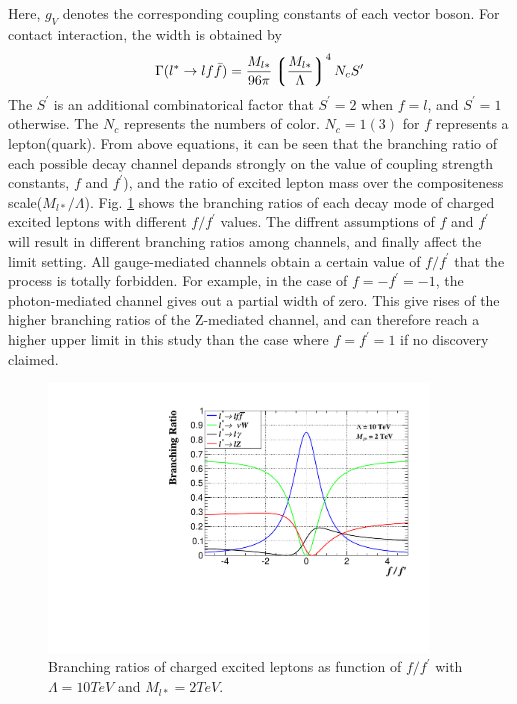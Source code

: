 \noindent Here, $g_{V}$ denotes the corresponding coupling constants of each vector boson. For contact interaction, the width is obtained by
\begin{align}
\Gamma (l^{*}\rightarrow lf\bar{f}) = \frac{M_{l*}}{96\pi}\left\lgroup \frac{M_{l*}}{\Lambda}\right\rgroup^{4}N_{c}S^{\prime}
\end{align}
\noindent The $S^{\prime}$ is an additional combinatorical factor that $S^{\prime} = 2$ when $f = l$, and $S^{\prime} = 1$ otherwise. The $N_{c}$ represents the numbers of color. $N_{c} = 1(3)$ for $f$ represents a lepton(quark).
\newline From above equations, it can be seen that the branching ratio of each possible decay channel depands strongly on the value of coupling strength constants, $f$ and $f^{\prime}$), and the ratio of excited lepton mass over the compositeness scale($M_{l*}/\Lambda$). Fig. \ref{fig:BRff} shows the branching ratios of each decay mode of charged excited leptons with different $f / f^{\prime}$ values. The diffrent assumptions of $f$ and $f^{\prime}$ will result in different branching ratios among channels, and finally affect the limit setting. All gauge-mediated channels obtain a certain value of $f / f^{\prime}$ that the process is totally forbidden. For example, in the case of $f = -f^{\prime} = -1$, the photon-mediated channel gives out a partial width of zero. This give rises of the higher branching ratios of the Z-mediated channel, and can therefore reach a higher upper limit in this study than the case where $f = f^{\prime} = 1$ if no discovery claimed.     

\begin{figure}[h!]
\begin{center}
\includegraphics[width=0.9\textwidth]{plot/BRff.pdf}  
\caption{\label{fig:BRff}Branching ratios of charged excited leptons as function of $f / f^{\prime}$ with $\Lambda = 10 TeV$ and $M_{l*} = 2 TeV$.}
\end{center}
\end{figure}

